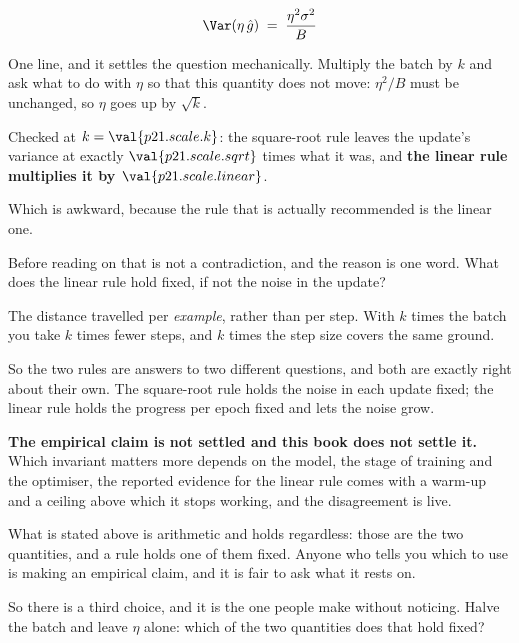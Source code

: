 \begin{fr}
\begin{ansblock}
\[ \Var(\eta\,\hat g) \;=\; \frac{\eta^{2}\sigma^{2}}{B} \]
\end{ansblock}

One line, and it settles the question mechanically. Multiply the batch by $k$
and ask what to do with $\eta$ so that this quantity does not move:
$\eta^{2}/B$ must be unchanged, so $\eta$ goes up by $\sqrt{k}$.

Checked at $k = \val{p21.scale.k}$: the square-root rule leaves the update's
variance at exactly $\val{p21.scale.sqrt}$ times what it was, and \textbf{the
linear rule multiplies it by $\val{p21.scale.linear}$}.
\end{fr}

\begin{fr}
Which is awkward, because the rule that is actually recommended is the linear
one.

Before reading on \dash{} that is not a contradiction, and the reason is one
word. What does the linear rule hold fixed, if not the noise in the update?
\nextframe
\end{fr}

\begin{fr}
\begin{ansblock}
The distance travelled per \emph{example}, rather than per step. With $k$
times the batch you take $k$ times fewer steps, and $k$ times the step size
covers the same ground.
\end{ansblock}

So the two rules are answers to two different questions, and both are exactly
right about their own. The square-root rule holds the noise in each update
fixed; the linear rule holds the progress per epoch fixed and lets the noise
grow.

\begin{warning}
\textbf{The empirical claim is not settled and this book does not settle it.}
Which invariant matters more depends on the model, the stage of training and
the optimiser, the reported evidence for the linear rule comes with a warm-up
and a ceiling above which it stops working, and the disagreement is live.

What is stated above is arithmetic and holds regardless: those are the two
quantities, and a rule holds one of them fixed. Anyone who tells you which to
use is making an empirical claim, and it is fair to ask what it rests on.
\end{warning}

So there is a third choice, and it is the one people make without noticing.
Halve the batch and leave $\eta$ alone: which of the two quantities does that
hold fixed?
\nextframe
\end{fr}

